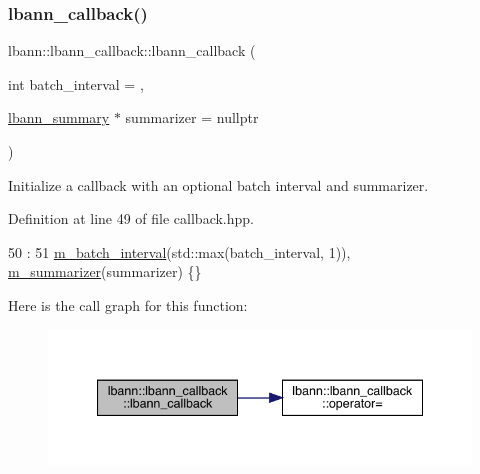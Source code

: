 \subsubsection{\texorpdfstring{lbann\+\_\+callback()}{lbann\_callback()}\hspace{0.1cm}{\footnotesize\ttfamily [1/2]}}
{\footnotesize\ttfamily lbann\+::lbann\+\_\+callback\+::lbann\+\_\+callback (\begin{DoxyParamCaption}\item[{int}]{batch\+\_\+interval = {},  }\item[{\hyperlink{classlbann_1_1lbann__summary}{lbann\+\_\+summary} $\ast$}]{summarizer = {\ttfamily nullptr} }\end{DoxyParamCaption})\hspace{0.3cm}{\ttfamily [inline]}}

Initialize a callback with an optional batch interval and summarizer. 

Definition at line 49 of file callback.\+hpp.


\begin{DoxyCode}
50                                                       :
51     \hyperlink{classlbann_1_1lbann__callback_a6126e310e9924398c18ccf76bb91c705}{m\_batch\_interval}(std::max(batch\_interval, 1)), \hyperlink{classlbann_1_1lbann__callback_a277d46138184f85f161a8263b8322c76}{m\_summarizer}(summarizer) \{\}
\end{DoxyCode}
Here is the call graph for this function\+:\nopagebreak
\begin{figure}[H]
\begin{center}
\leavevmode
\includegraphics[width=340pt]{classlbann_1_1lbann__callback_a679057298a41ddd47f08c157f756c584_cgraph}
\end{center}
\end{figure}
\mbox{\label{classlbann_1_1lbann__callback_a91d994616b8bf98685ac32939228f96a}} 
